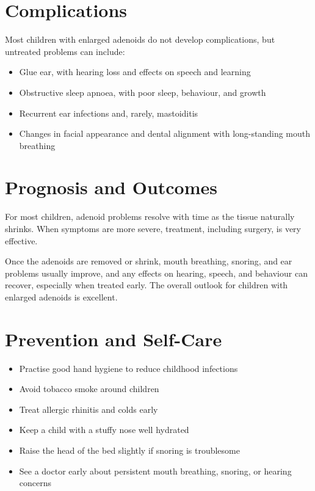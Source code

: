 \section*{Complications}
Most children with enlarged adenoids do not develop complications, but untreated problems can include:

\begin{itemize}
    \item Glue ear, with hearing loss and effects on speech and learning
    \item Obstructive sleep apnoea, with poor sleep, behaviour, and growth
    \item Recurrent ear infections and, rarely, mastoiditis
    \item Changes in facial appearance and dental alignment with long-standing mouth breathing
\end{itemize}

\section*{Prognosis and Outcomes}
For most children, adenoid problems resolve with time as the tissue naturally shrinks. When symptoms are more severe, treatment, including surgery, is very effective.

Once the adenoids are removed or shrink, mouth breathing, snoring, and ear problems usually improve, and any effects on hearing, speech, and behaviour can recover, especially when treated early. The overall outlook for children with enlarged adenoids is excellent.

\section*{Prevention and Self-Care}
\begin{itemize}
    \item Practise good hand hygiene to reduce childhood infections
    \item Avoid tobacco smoke around children
    \item Treat allergic rhinitis and colds early
    \item Keep a child with a stuffy nose well hydrated
    \item Raise the head of the bed slightly if snoring is troublesome
    \item See a doctor early about persistent mouth breathing, snoring, or hearing concerns
\end{itemize}

